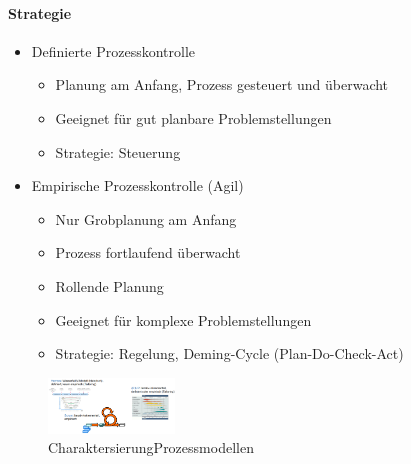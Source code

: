 \documentclass[../ZF_SWEN1.tex]{subfiles}
\begin{document}
\paragraph{Strategie}
\begin{itemize}
    \item Definierte Prozesskontrolle
    \begin{itemize}
        \item Planung am Anfang, Prozess gesteuert und überwacht
        \item Geeignet für gut planbare Problemstellungen
        \item Strategie: Steuerung
    \end{itemize}
    \item Empirische Prozesskontrolle (Agil)
    \begin{itemize}
        \item Nur Grobplanung am Anfang
        \item Prozess fortlaufend überwacht
        \item Rollende Planung
        \item Geeignet für komplexe Problemstellungen
        \item Strategie: Regelung, Deming-Cycle (Plan-Do-Check-Act)
    \end{itemize}
\end{itemize}

\begin{figure}[H]
\centering
\includegraphics[width=0.3\textwidth]{Resources/Images/CharaktersierungProzessmodellen.png}
\caption{\label{fig:CharaktersierungProzessmodellen}CharaktersierungProzessmodellen}
\end{figure}
\end{document}

